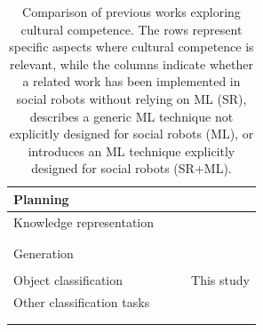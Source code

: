 \begin{table}[t]
\begin{tabular}{l|c|c|c}
\hline
Planning & \citep{Planning, fedriga2023linguistic} &  &  \\
\hline
Knowledge representation & \makecell{\citep{GreetingSelection, KnowledgeRepresentation}\\
\citep{Grassi_2022, mansouri2020can}\\
\citep{bringsjord2020culturally}} &  &  \\
\hline
Generation &  & \makecell{\citep{Quan2018, Zhou2022445}\\
\citep{yun2024cic, mohamed2022artelingo}} &  \\
\hline
Object classification &  &  & This study \\
\hline
Other classification tasks & \citep{Chiang2019} 
& \makecell{\citep{alharbi2023cultural, alharbi2024deep}\\
\citep{jordan2023impact, castilla2022applying}\\
\citep{yohe2023towards}} 
& \citep{santos2018extended} \\
\bottomrule
\end{tabular}
\caption{Comparison of previous works exploring cultural competence. 
The rows represent specific aspects where cultural competence is relevant, while the columns indicate whether a related work has been implemented in social robots without relying on ML (SR), describes a generic ML technique not explicitly designed for social robots (ML), or introduces an ML technique explicitly designed for social robots (SR+ML).}
\label{ch1:tab:related}
\end{table}
